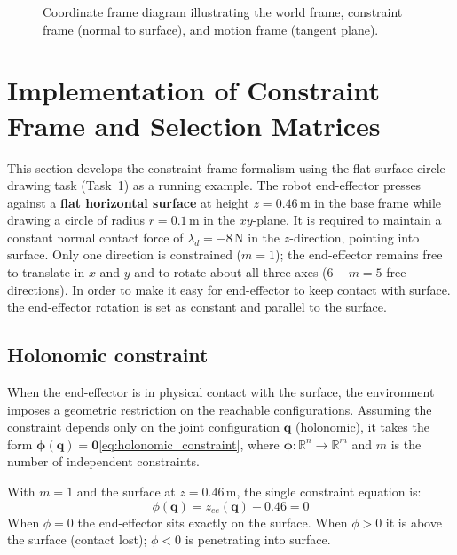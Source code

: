\documentclass[
	german,%
	accentcolor=9c,%
	ruledheaders=section,%
	class=report,%
	thesis={type=bachelor},%
	fontsize=11pt,%
	parskip=half-,%
	custommargins=true,%
	marginpar=false,%
]{tudapub}
\begin{document}
\begin{figure}[htbp]
    \centering
    \caption{Coordinate frame diagram illustrating the world frame, constraint
             frame (normal to surface), and motion frame (tangent plane).}
    \label{fig:coord_frames}
\end{figure}


\section{Implementation of Constraint Frame and Selection Matrices}
\label{sec:constraint_frame}

This section develops the constraint-frame formalism using the flat-surface
circle-drawing task (Task~1) as a running example.
The robot end-effector presses against a \textbf{flat horizontal surface} at
height $z = 0.46\,\mathrm{m}$ in the base frame while drawing a circle of
radius $r = 0.1\,\mathrm{m}$ in the $xy$-plane.
It is required to maintain a constant normal contact force of
$\lambda_d = -8\,\mathrm{N}$ in the $z$-direction, pointing into surface.
Only one direction is constrained ($m = 1$); the end-effector remains free
to translate in $x$ and $y$ and to rotate about all three axes
($6 - m = 5$ free directions). In order to make it easy for end-effector to keep contact with surface. the end-effector rotation is set as constant and parallel to the surface.

\subsection*{Holonomic constraint}

When the end-effector is in physical contact with the surface, the environment
imposes a geometric restriction on the reachable configurations.
Assuming the constraint depends only on the joint configuration
$\mathbf{q}$ (holonomic), it takes the form $\boldsymbol{\phi}(\mathbf{q}) = \mathbf{0}$\eqref{eq:holonomic_constraint}, 
where $\boldsymbol{\phi}: \mathbb{R}^n \to \mathbb{R}^m$ and $m$ is the number
of independent constraints.

\begin{tcolorbox}[
    colback=gray!8, colframe=gray!45,
    title={Example~1 — Constraint equation \eqref{eq:holonomic_constraint}},
    fonttitle=\bfseries\small, left=6pt, right=6pt, top=4pt, bottom=4pt]
\small
With $m = 1$ and the surface at $z = 0.46\,\mathrm{m}$, the single
constraint equation is:
\begin{equation*}
    \phi(\mathbf{q}) = z_{ee}(\mathbf{q}) - 0.46 = 0
\end{equation*}
When $\phi = 0$ the end-effector sits exactly on the surface.
When $\phi > 0$ it is above the surface (contact lost);
$\phi < 0$ is penetrating into surface.
\end{tcolorbox}
\end{document}
